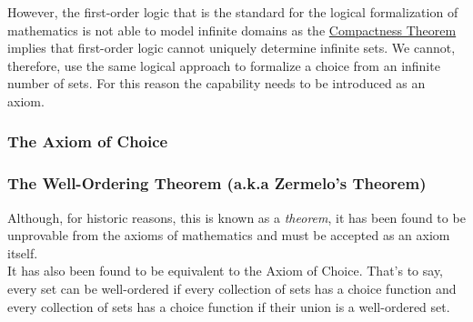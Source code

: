 \documentclass[MathsNotesBase.tex]{subfiles}
\begin{document}
{		However, the first-order logic that is the standard for the logical formalization of mathematics is not able to model infinite domains as the \href{https://en.wikipedia.org/wiki/Compactness_theorem}{Compactness Theorem} implies that first-order logic cannot uniquely determine infinite sets. We cannot, therefore, use the same logical approach to formalize a choice from an infinite number of sets. For this reason the capability needs to be introduced as an axiom.
		
		\bigskip
		\subsubsection{The Axiom of Choice}\label{sssection:axiom-of-choice}
		
		
		\subsubsection{The Well-Ordering Theorem (a.k.a Zermelo's Theorem)}\label{sssection:well-ordering-theorem}
		
		
		Although, for historic reasons, this is known as a \textit{theorem}, it has been found to be unprovable from the axioms of mathematics and must be accepted as an axiom itself.\\
		
		It has also been found to be equivalent to the Axiom of Choice. That's to say, every set can be well-ordered if every collection of sets has a choice function and every collection of sets has a choice function if their union is a well-ordered set.\\
		
}
\end{document}
